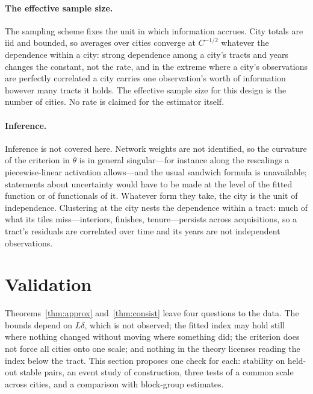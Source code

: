 \documentclass[11pt]{article}
\theoremstyle{remark}
\begin{document}
\paragraph{The effective sample size.} The sampling scheme fixes the unit in which information
accrues. City totals are iid and bounded, so
averages over cities converge at $C^{-1/2}$ whatever the dependence within a city: strong dependence
among a city's tracts and years changes the constant, not the rate, and in the extreme where a city's
observations are perfectly correlated a city carries one observation's worth of information however
many tracts it holds. The effective sample size for this design is the number of cities. No rate is
claimed for the estimator itself.

\paragraph{Inference.} Inference is not covered here. Network weights are not identified, so the
curvature of the criterion in $\theta$ is in general singular---for instance along the rescalings a
piecewise-linear activation allows---and the usual sandwich formula is unavailable;
statements about uncertainty would have to be made at the level of the fitted function or of functionals
of it. Whatever form they take, the city is the unit of independence. Clustering at the city nests the
dependence within a tract: much of what its tiles miss---interiors, finishes, tenure---persists across
acquisitions, so a tract's residuals are correlated over time and its years are not independent
observations.

\section{Validation}\label{sec:valid}

Theorems~\ref{thm:approx} and~\ref{thm:consist} leave four questions to the data. The bounds depend on
$L\delta$, which is not observed; the fitted index may hold still where nothing changed without moving
where something did; the criterion does not force all cities onto one scale; and nothing in the theory
licenses reading the index below the tract. This section proposes one check for each: stability on
held-out stable pairs, an event study of construction, three tests of a common scale across cities, and
a comparison with block-group estimates.
\end{document}
